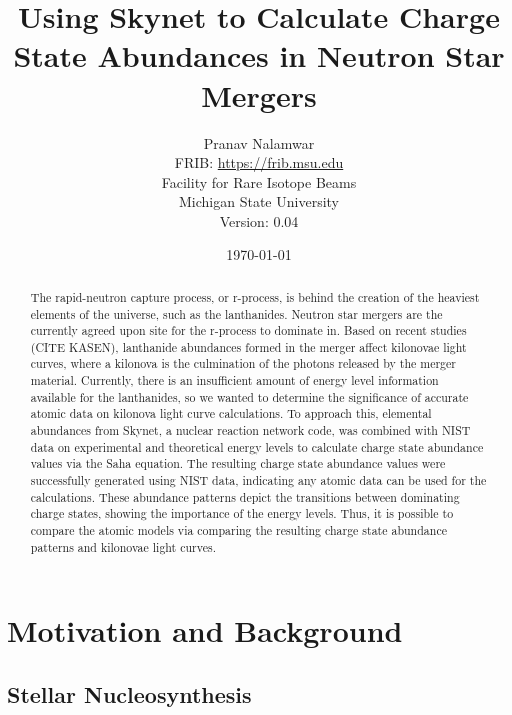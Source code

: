\documentclass[11pt,a4paper]{article}
\begin{document}
\title{Using Skynet to Calculate Charge State Abundances in Neutron Star Mergers}

\author{Pranav Nalamwar\\FRIB: \url{https://frib.msu.edu}\\Facility for Rare Isotope Beams\\Michigan State University\\Version: 0.04} 
\date{\today}
\maketitle

\begin{abstract}
The rapid-neutron capture process, or r-process, is behind the creation of the heaviest elements of the universe, such as the lanthanides. Neutron star mergers are the currently agreed upon site for the r-process to dominate in. Based on recent studies (CITE KASEN), lanthanide abundances formed in the merger affect kilonovae light curves, where a kilonova is the culmination of the photons released by the merger material. Currently, there is an insufficient amount of energy level information available for the lanthanides, so we wanted to determine the significance of accurate atomic data on kilonova light curve calculations. To approach this, elemental abundances from Skynet, a nuclear reaction network code, was combined with NIST data on experimental and theoretical energy levels to calculate charge state abundance values via the Saha equation. The resulting charge state abundance values were successfully generated using NIST data, indicating any atomic data can be used for the calculations. These abundance patterns depict the transitions between dominating charge states, showing the importance of the energy levels. Thus, it is possible to compare the atomic models via comparing the resulting charge state abundance patterns and kilonovae light curves. 

\end{abstract}

\tableofcontents

\section{Motivation and Background}

\subsection{Stellar Nucleosynthesis}
\end{document}
